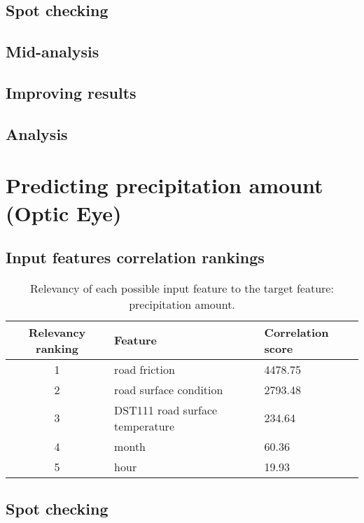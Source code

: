 	\subsection{Spot checking}
	\subsection{Mid-analysis}
	\subsection{Improving results}
		
	\subsection{Analysis}

\section{Predicting precipitation amount (Optic Eye)}

	\subsection{Input features correlation rankings}

	\begin{table}[H]
		\centering
		\caption{Relevancy of each possible input feature to the target feature: precipitation amount. }
		\begin{tabular}[3]{c | l | l }
    			Relevancy ranking & Feature & Correlation score  \\
			 \hline
			1 & road friction & 4478.75 \\
			2 & road surface condition & 2793.48 \\
			3 & DST111 road surface temperature & 234.64 \\
			4 & month & 60.36 \\
			5 & hour & 19.93 
			\label{table:feature_comparison_precamount}
		\end{tabular}
	\end{table}

	\subsection{Spot checking}

